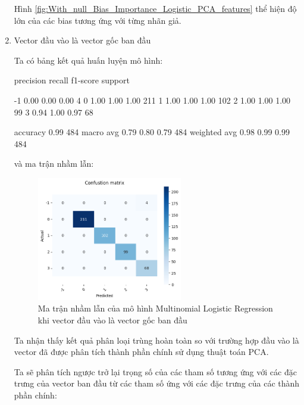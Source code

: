 \begin{enumerate}[label=(\alph*)]
    Hình \ref{fig:With_null_Bias_Importance_Logistic_PCA_features} thể hiện độ lớn của các bias tương ứng với từng nhãn giả.

    \item Vector đầu vào là vector gốc ban đầu
    
    Ta có bảng kết quả huấn luyện mô hình:

    \begin{python}
        precision    recall  f1-score   support

        -1       0.00      0.00      0.00         4
         0       1.00      1.00      1.00       211
         1       1.00      1.00      1.00       102
         2       1.00      1.00      1.00        99
         3       0.94      1.00      0.97        68

  accuracy                           0.99       484
 macro avg       0.79      0.80      0.79       484
weighted avg       0.98      0.99      0.99       484
    \end{python}

    và ma trận nhầm lẫn:

    \begin{figure}[H]
        \centering
        \includegraphics[width=0.6\textwidth]{figures/Thanh/Data_Analysis/With_null_confusion_matrix_Logistic_original_features.png}
        \caption{Ma trận nhầm lẫn của mô hình Multinomial Logistic Regression khi vector đầu vào là vector gốc ban đầu}
        \label{fig:With_null_confusion_matrix_Logistic_original_features}
    \end{figure}

    Ta nhận thấy kết quả phân loại trùng hoàn toàn so với trường hợp đầu vào là vector đã được phân tích thành phần chính sử dụng thuật toán PCA.

    Ta sẽ phân tích ngược trở lại trọng số của các tham số tương ứng với các đặc trưng của vector ban đầu từ các tham số ứng với các đặc trưng của các thành phần chính:


\end{enumerate}
